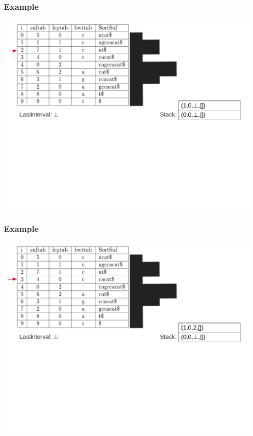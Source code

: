 \documentclass[compress,handout]{beamer} %
\begin{document}
\begin{frame}
	\frametitle{Example}
	\includegraphics[width=\textwidth, height=\textheight, keepaspectratio=true]{traversal_3}
\end{frame}

\begin{frame}
	\frametitle{Example}
	\includegraphics[width=\textwidth, height=\textheight, keepaspectratio=true]{traversal_4}
\end{frame}
\end{document}
